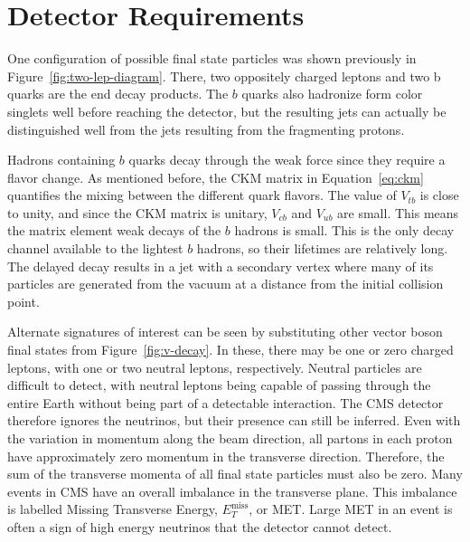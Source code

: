 \section{Detector Requirements} \label{sec:requirements}

One configuration of possible final state particles was shown previously
in Figure~\ref{fig:two-lep-diagram}.
There, two oppositely charged leptons and two b quarks are the end decay products.
The $b$ quarks also hadronize  form color singlets well before reaching the detector,
but the resulting jets can actually be distinguished well from the jets resulting
from the fragmenting protons.

Hadrons containing $b$ quarks decay through the weak force
since they require a flavor change.
As mentioned before, the CKM matrix in Equation~\ref{eq:ckm}
quantifies the mixing between the different quark flavors.
The value of $V_{tb}$ is close to unity, and since the CKM matrix is unitary,
$V_{cb}$ and $V_{ub}$ are small. 
This means the matrix element weak decays of the $b$ hadrons is small.
This is the only decay channel available to the lightest $b$ hadrons,
so their lifetimes are relatively long.
The delayed decay results in a jet with a secondary vertex where many of its particles
are generated from the vacuum at a distance from the initial collision point.

Alternate signatures of interest can be seen by substituting other vector boson final states
from Figure~\ref{fig:v-decay}.
In these, there may be one or zero charged leptons,
with one or two neutral leptons, respectively.
Neutral particles are difficult to detect,
with neutral leptons being capable of passing through the entire Earth without
being part of a detectable interaction.
The CMS detector therefore ignores the neutrinos,
but their presence can still be inferred.
Even with the variation in momentum along the beam direction,
all partons in each proton have approximately zero momentum in the transverse direction.
Therefore, the sum of the transverse momenta of all final state particles must also be zero.
Many events in CMS have an overall imbalance in the transverse plane.
This imbalance is labelled Missing Transverse Energy, $E^\textrm{miss}_T$, or MET.
Large MET in an event is often a sign of high energy neutrinos
that the detector cannot detect. 

